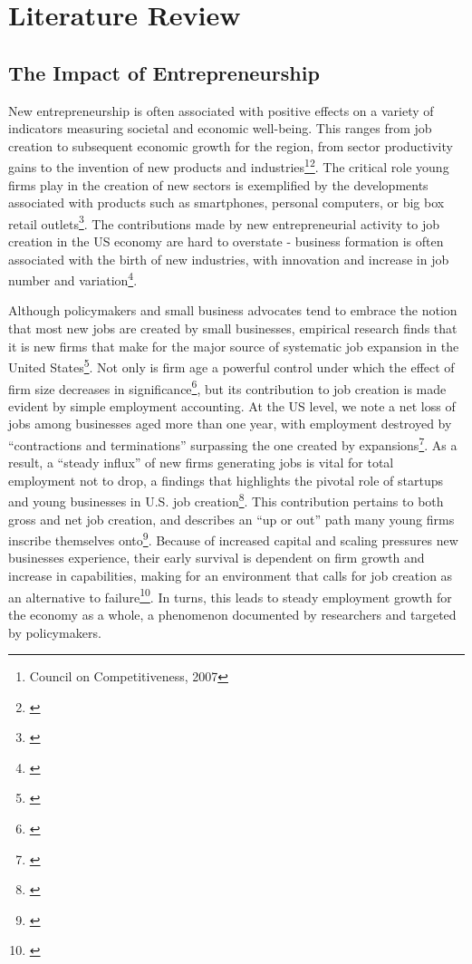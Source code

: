 
\chapter{Literature Review\label{ch:pastwork}}

\section{The Impact of Entrepreneurship}

New entrepreneurship is often associated with positive effects on a variety of indicators measuring societal and economic well-being. This ranges from job creation to subsequent economic growth for the region, from sector productivity gains to the invention of new products and industries\footnote{Council on Competitiveness, 2007}\hspace{.15em}\footnote{\cite{Reynolds2007}}. The critical role young firms play in the creation of new sectors is exemplified by the developments associated with products such as smartphones, personal computers, or big box retail outlets\footnote{\cite{GartnerShaverCarterReynolds2004}}. The contributions made by new entrepreneurial activity to job creation in the US economy are hard to overstate - business formation is often associated with the birth of new industries, with innovation and increase in job number and variation\footnote{\cite{ReynoldsWhite1997}}. 

Although policymakers and small business advocates tend to embrace the notion that most new jobs are created by small businesses, empirical research finds that it is new firms that make for the major source of systematic job expansion in the United States\footnote{\cite{AcsArmington2004}}. Not only is firm age a powerful control under which the effect of firm size decreases in significance\footnote{\cite{HaltiwangerJarminMiranda2013}}, but its contribution to job creation is made evident by simple employment accounting. At the US level, we note a net loss of jobs among businesses aged more than one year, with employment destroyed by ``contractions and terminations'' surpassing the one created by expansions\footnote{\cite{AcsArmington2004}}. As a result, a ``steady influx'' of new firms generating jobs is vital for total employment not to drop, a findings that highlights the pivotal role of startups and young businesses in U.S. job creation\footnote{\cite{AcsArmington2004}}. This contribution pertains to both gross and net job creation, and describes an ``up or out'' path many young firms inscribe themselves onto\footnote{\cite{AcsArmington2004}}. Because of increased capital and scaling pressures new businesses experience, their early survival is dependent on firm growth and increase in capabilities, making for an environment that calls for job creation as an alternative to failure\footnote{\cite{AcsArmington2004}}. In turns, this leads to steady employment growth for the economy as a whole, a phenomenon documented by researchers and targeted by policymakers.

